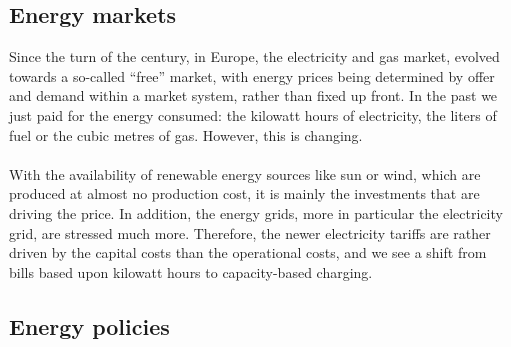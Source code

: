 \documentclass[../summary.tex]{subfiles}
\begin{document}
	\subsection{Energy markets}
	
	 Since the turn of the century, in Europe, the electricity and gas market, evolved towards a so-called “free” market, with energy prices being determined by offer and demand within a market system, rather than fixed up front. In the past we just paid for the energy consumed: the kilowatt hours of electricity, the liters of fuel or the cubic metres of gas. However, this is changing.
	\\\\
	With the availability of renewable energy sources like sun or wind, which are produced at almost no production cost, it is mainly the investments that are driving the price. In addition, the energy grids, more in particular the electricity grid, are stressed much more. Therefore, the newer electricity tariffs are rather driven by the capital costs than the operational costs, and we see a shift from bills based upon kilowatt hours to capacity-based charging. 
	
	\subsection{Energy policies}
	
	
	
	
\end{document}
